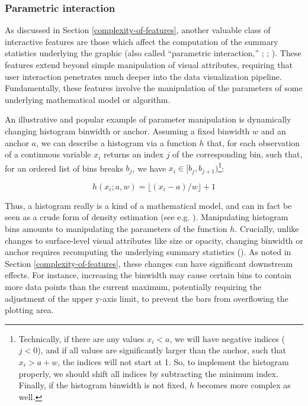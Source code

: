 \documentclass[
]{book}
\theoremstyle{definition}
\theoremstyle{definition}
\theoremstyle{definition}
\theoremstyle{definition}
\theoremstyle{remark}
\begin{document}
\subsubsection{Parametric interaction}\label{parametric-interaction}

As discussed in Section \ref{complexity-of-features}, another valuable class of interactive features are those which affect the computation of the summary statistics underlying the graphic (also called ``parametric interaction,'' ; ; ). These features extend beyond simple manipulation of visual attributes, requiring that user interaction penetrates much deeper into the data visualization pipeline. Fundamentally, these features involve the manipulation of the parameters of some underlying mathematical model or algorithm.

An illustrative and popular example of parameter manipulation is dynamically changing histogram binwidth or anchor. Assuming a fixed binwidth \(w\) and an anchor \(a\), we can describe a histogram via a function \(h\) that, for each observation of a continuous variable \(x_i\) returns an index \(j\) of the corresponding bin, such that, for an ordered list of bins breaks \(b_j\), we have \(x_i \in [b_{j}, b_{j + 1})\)\footnote{Technically, if there are any values \(x_i < a\), we will have negative indices (\(j < 0\)), and if all values are significantly larger than the anchor, such that \(x_i > a + w\), the indices will not start at 1. So, to implement the histogram properly, we should shift all indices by subtracting the minimum index. Finally, if the histogram binwidth is not fixed, \(h\) becomes more complex as well.}:

\[h(x_i; a, w) = \lfloor (x_i - a) / w \rfloor + 1\]

Thus, a histogram really is a kind of a mathematical model, and can in fact be seen as a crude form of density estimation (see e.g. ). Manipulating histogram bins amounts to manipulating the parameters of the function \(h\). Crucially, unlike changes to surface-level visual attributes like size or opacity, changing binwidth or anchor requires recomputing the underlying summary statistics (). As noted in Section \ref{complexity-of-features}, these changes can have significant downstream effects. For instance, increasing the binwidth may cause certain bins to contain more data points than the current maximum, potentially requiring the adjustment of the upper y-axis limit, to prevent the bars from overflowing the plotting area.
\end{document}
